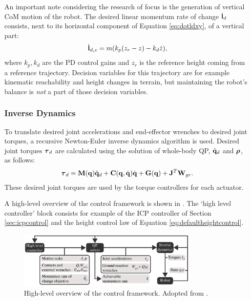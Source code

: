 An important note considering the research of focus is the generation of vertical \ac{CoM} motion of the robot. The desired linear momentum rate of change $\dot{\mathbf{l}}_d$ consists, next to its horizontal component of Equation \eqref{eq:dotldxy}, of a vertical part:
\begin{equation}
\dot{\mathbf{l}}_{d,z} =m(k_p(z_r-z) - k_d\dot{z}), 
\label{eq:defaultheightcontrol}
\end{equation}
where $k_p, k_d$ are the PD control gains and $z_r$ is the reference height coming from a reference trajectory. Decision variables for this trajectory are for example kinematic reachability and height changes in terrain, but maintaining the robot's balance is \textit{not} a part of those decision variables.


\subsubsection{Inverse Dynamics} 
To translate desired joint accelerations and end-effector wrenches to desired joint torques, a recursive Newton-Euler inverse dynamics algorithm is used. Desired joint torques $\boldsymbol{\tau}_d$ are calculated using the solution of whole-body \ac{QP}, $\ddot{\mathbf{q}}_d$ and $\boldsymbol{\rho}$, as follows:
\begin{equation}
    \boldsymbol{\tau}_d = \mathbf{M}(\mathbf{q})\ddot{\mathbf{q}}_d + \mathbf{C}(\mathbf{q},\dot{\mathbf{q}})\dot{\mathbf{q}} + \mathbf{G}(\mathbf{q}) + \mathbf{J}^T \mathbf{W}_{gr}.
\end{equation}
These desired joint torques are used by the torque controllers for each actuator.

A high-level overview of the control framework is shown in . The `high level controller' block consists for example of the \ac{ICP} controller of Section \ref{sec:icpcontrol} and the height control law of Equation \eqref{eq:defaultheightcontrol}.
\begin{figure}[h]
\centering
\includegraphics[width=0.8\textwidth]{STYLESTUFF/controlframework.png}
\caption{High-level overview of the control framework. Adopted from \cite{koolen2016design}. }
\label{fig:framework}
\end{figure}

